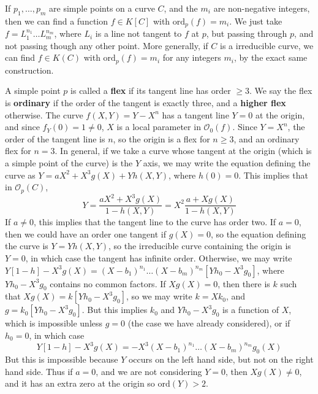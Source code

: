\begin{example}
    If $p_1, \dots, p_m$ are simple points on a curve $C$, and the $m_i$ are non-negative integers, then we can find a function $f \in K[C]$ with $\text{ord}_p(f) = m_i$. We just take $f = L_1^{n_1} \dots L_m^{n_m}$, where $L_i$ is a line not tangent to $f$ at $p$, but passing through $p$, and not passing though any other point. More generally, if $C$ is a irreducible curve, we can find $f \in K(C)$ with $\text{ord}_p(f) = m_i$ for any integers $m_i$, by the exact same construction.
\end{example}

\begin{example}
    A simple point $p$ is called a {\bf flex} if its tangent line has order $\geq 3$. We say the flex is {\bf ordinary} if the order of the tangent is exactly three, and a {\bf higher flex} otherwise. The curve $f(X,Y) = Y - X^n$ has a tangent line $Y = 0$ at the origin, and since $f_Y(0) = 1 \neq 0$, $X$ is a local parameter in $\mathcal{O}_0(f)$. Since $Y = X^n$, the order of the tangent line is $n$, so the origin is a flex for $n \geq 3$, and an ordinary flex for $n = 3$. In general, if we take a curve whose tangent at the origin (which is a simple point of the curve) is the $Y$ axis, we may write the equation defining the curve as $Y = aX^2 + X^3g(X) + Yh(X,Y)$, where $h(0) = 0$. This implies that in $\mathcal{O}_p(C)$,
    \[ Y = \frac{aX^2 + X^3g(X)}{1 - h(X,Y)} = X^2 \frac{a + Xg(X)}{1 - h(X,Y)} \]
    If $a \neq 0$, this implies that the tangent line to the curve has order two. If $a = 0$, then we could have an order one tangent if $g(X) = 0$, so the equation defining the curve is $Y = Yh(X,Y)$, so the irreducible curve containing the origin is $Y = 0$, in which case the tangent has infinite order. Otherwise, we may write $Y[1-h] - X^3g(X) = (X-b_1)^{n_1} \dots (X-b_m)^{n_m} [Yh_0 - X^3g_0]$, where $Yh_0 - X^3g_0$ contains no common factors. If $Xg(X) = 0$, then there is $k$ such that $Xg(X) = k[Yh_0 - X^3g_0]$, so we may write $k = Xk_0$, and $g = k_0[Yh_0 - X^3g_0]$. But this implies $k_0$ and $Yh_0 - X^3g_0$ is a function of $X$, which is impossible unless $g = 0$ (the case we have already considered), or if $h_0 = 0$, in which case
    \[ Y[1-h] - X^3g(X) = -X^3(X-b_1)^{n_1} \dots (X - b_m)^{n_m} g_0(X) \]
    But this is impossible because $Y$ occurs on the left hand side, but not on the right hand side. Thus if $a = 0$, and we are not considering $Y = 0$, then $Xg(X) \neq 0$, and it has an extra zero at the origin so $\text{ord}(Y) > 2$.
\end{example}


